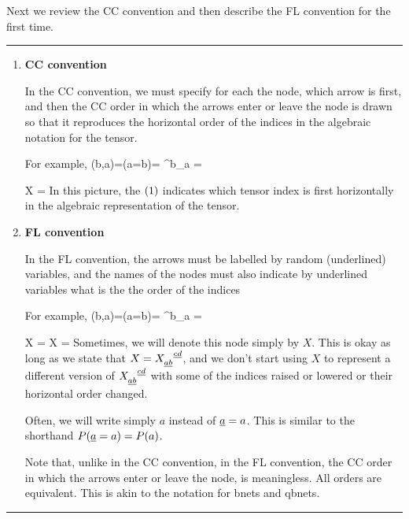 Next we review 
the CC convention
and then describe the
FL convention for the first time. 
\hrule
\begin{enumerate}

\item {\bf CC convention}

In the CC convention,
we must specify for each the node, which arrow is first,
and then the CC 
order in which
the arrows 
enter or leave the node
is drawn so that it
reproduces 
the horizontal order
of the indices in the
algebraic notation for the tensor.

For example,
\beq
\delta(b,a)=\indi(a=b)=
\delta^b_a =
\eeq


\beq
X
=
\bcen
{}\ecen
\eeq
In this picture, the
$\tiny (1)$ indicates
which tensor index is first
horizontally in the algebraic
representation of the tensor.

\item {\bf FL convention}

In the FL convention,
the arrows must be labelled
by random (underlined)
variables, and
the names of the nodes
must also indicate
by underlined variables
what is the the order of
the indices

For example,
\beq
\delta(b,a)=\indi(a=b)=
\delta^b_a =
\eeq


\beq
{}
X\indices{_\rva_\rvb^\rvc}
=
X
=
\bcen
{}\ecen
\eeq
Sometimes, 
we will denote
this node simply by $X$.
This is okay as long as
we state that $X=X\indices{_\rva_\rvb^\rvc^\rvd}$, and we 
don't start using $X$ 
to represent 
a different version of $X\indices{_\rva_\rvb^\rvc^\rvd}$
with some of the indices
raised or lowered or 
their horizontal order changed.

Often, we will
write simply $a$ instead
of $\rva=a$. This
is similar to
the shorthand
$P(\rva=a)=P(a)$.

Note that,
unlike in the CC 
convention, in the FL
convention, the CC 
order in which the
arrows enter or leave
the node, is meaningless.
All orders are  equivalent. This is
akin to the notation
for bnets and qbnets.


\end{enumerate}
\hrule


